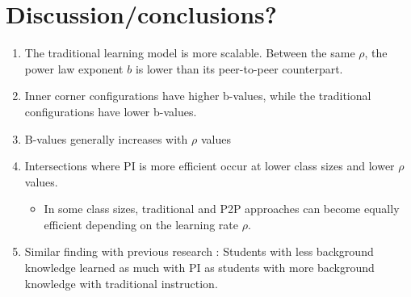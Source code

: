 \section{Discussion/conclusions?}
\begin{enumerate}
    \item The traditional learning model is more scalable. Between the same $\rho$, the power law exponent $b$ is lower than its peer-to-peer counterpart.
    \item Inner corner configurations have higher b-values, while the traditional configurations have lower b-values.
    \item B-values generally increases with $\rho$ values
    \item Intersections where PI is more efficient occur at lower class sizes and lower $\rho$ values.
    
    \begin{itemize}
        \item In some class sizes, traditional and P2P approaches can become equally efficient depending on the learning rate $\rho$.
    \end{itemize}

    \item Similar finding with previous research \cite{lasry2008peer}: Students with less background knowledge learned as much with PI as students with more background knowledge with traditional instruction.

\end{enumerate}

    
